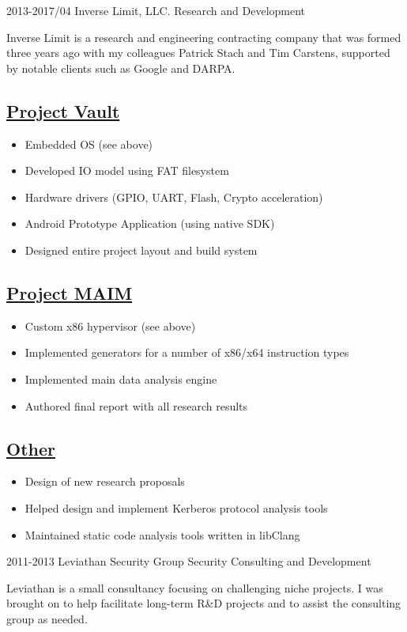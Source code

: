 \documentclass[]{friggeri-cv}
\newcommand{\heading}[1]{
  \vskip 0.05in
  \subsection{\uline{\small{#1}}}
  \vskip 0.05in
}
\begin{document}
\begin{entrylist}
  \entry
    {2013-2017/04}
    {Inverse Limit, LLC.}
    {Research and Development}
    {

      Inverse Limit is a research and engineering contracting company
      that was formed three years ago with my colleagues
      Patrick Stach and Tim Carstens, supported by notable clients
      such as Google and DARPA. 

      \heading{Project Vault}
      
      \begin{itemize}
      \item{Embedded OS (see above)}
      \item{Developed IO model using FAT filesystem}
      \item{Hardware drivers (GPIO, UART, Flash, Crypto acceleration)}
      \item{Android Prototype Application (using native SDK)}
      \item{Designed entire project layout and build system}
      \end{itemize}

      \heading{Project MAIM}
      
      \begin{itemize}
      \item{Custom x86 hypervisor (see above)}
      \item{Implemented generators for a number of x86/x64 instruction types}
      \item{Implemented main data analysis engine}
      \item{Authored final report with all research results}
      \end{itemize}

      \heading{Other}
      
      \begin{itemize}
      \item{Design of new research proposals}
      \item{Helped design and implement Kerberos protocol analysis tools}
      \item{Maintained static code analysis tools written in libClang}
      \end{itemize}
      
    }
  \entry
    {2011-2013}
    {Leviathan Security Group}
    {Security Consulting and Development}
    {

      Leviathan is a small consultancy focusing on challenging niche
      projects. I was brought on to help facilitate long-term R\&D
      projects and to assist the consulting group as needed.
      
}
\end{entrylist}
\end{document}
